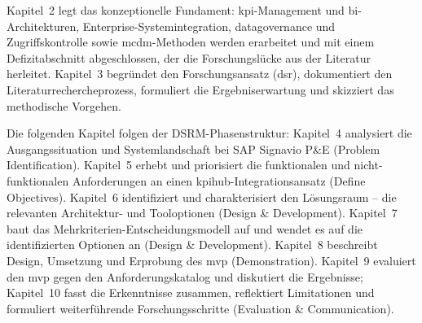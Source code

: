 Kapitel~2 legt das konzeptionelle Fundament: \gls{kpi}-Management und \gls{bi}-Architekturen, Enterprise-Systemintegration, \gls{datagovernance} und Zugriffskontrolle sowie \gls{mcdm}-Methoden werden erarbeitet und mit einem Defizitabschnitt abgeschlossen, der die Forschungslücke aus der Literatur herleitet.
Kapitel~3 begründet den Forschungsansatz (\gls{dsr}), dokumentiert den Literaturrechercheprozess, formuliert die Ergebniserwartung und skizziert das methodische Vorgehen.

Die folgenden Kapitel folgen der DSRM-Phasenstruktur:
Kapitel~4 analysiert die Ausgangssituation und Systemlandschaft bei SAP Signavio P\&E (Problem Identification).
Kapitel~5 erhebt und priorisiert die funktionalen und nicht-funktionalen Anforderungen an einen \gls{kpihub}-Integrationsansatz (Define Objectives).
Kapitel~6 identifiziert und charakterisiert den Lösungsraum -- die relevanten Architektur- und Tooloptionen (Design \& Development).
Kapitel~7 baut das Mehrkriterien-Entscheidungsmodell auf und wendet es auf die identifizierten Optionen an (Design \& Development).
Kapitel~8 beschreibt Design, Umsetzung und Erprobung des \gls{mvp} (Demonstration).
Kapitel~9 evaluiert den \gls{mvp} gegen den Anforderungskatalog und diskutiert die Ergebnisse; Kapitel~10 fasst die Erkenntnisse zusammen, reflektiert Limitationen und formuliert weiterführende Forschungsschritte (Evaluation \& Communication).
